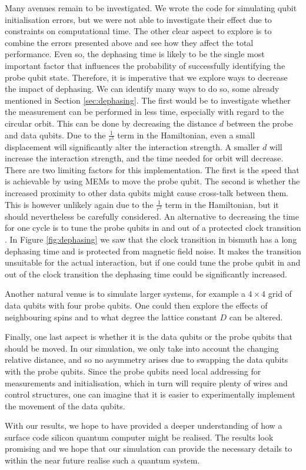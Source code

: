 Many avenues remain to be investigated. We wrote the code for simulating qubit initialisation errors, but we were not able to investigate their effect due to constraints on computational time. The other clear aspect to explore is to combine the errors presented above and see how they affect the total performance. Even so, the dephasing time is likely to be the single most important factor that influences the probability of successfully identifying the probe qubit state. Therefore, it is imperative that we explore ways to decrease the impact of dephasing. We can identify many ways to do so, some already mentioned in Section \ref{sec:dephasing}. The first would be to investigate whether the measurement can be performed in less time, especially with regard to the circular orbit. This can be done by decreasing the distance $d$ between the probe and data qubits. Due to the $\frac{1}{r^3}$ term in the Hamiltonian, even a small displacement will significantly alter the interaction strength. A smaller $d$ will increase the interaction strength, and the time needed for orbit will decrease. There are two limiting factors for this implementation. The first is the speed that is achievable by using MEMs to move the probe qubit. The second is whether the increased proximity to other data qubits might cause cross-talk between them. This is however unlikely again due to the $\frac{1}{r^3}$ term in the Hamiltonian, but it should nevertheless be carefully considered. An alternative to decreasing the time for one cycle is to tune the probe qubits in and out of a protected clock transition \cite{something}. In Figure \ref{fig:dephasing} we saw that the clock transition in bismuth has a long dephasing time and is protected from magnetic field noise. It makes the transition unsuitable for the actual interaction, but if one could tune the probe qubit in and out of the clock transition the dephasing time could be significantly increased. 

Another natural venue is to simulate larger systems, for example a $4\times 4$ grid of data qubits with four probe qubits. One could then explore the effects of neighbouring spins and to what degree the lattice constant $D$ can be altered. 

Finally, one last aspect is whether it is the data qubits or the probe qubits that should be moved. In our simulation, we only take into account the changing relative distance, and so no asymmetry arises due to swapping the data qubits with the probe qubits. Since the probe qubits need local addressing for measurements and initialisation, which in turn will require plenty of wires and control structures, one can imagine that it is easier to experimentally implement the movement of the data qubits. 

With our results, we hope to have provided a deeper understanding of how a surface code silicon quantum computer might be realised. The results look promising and we hope that our simulation can provide the necessary details to within the near future realise such a quantum system. 